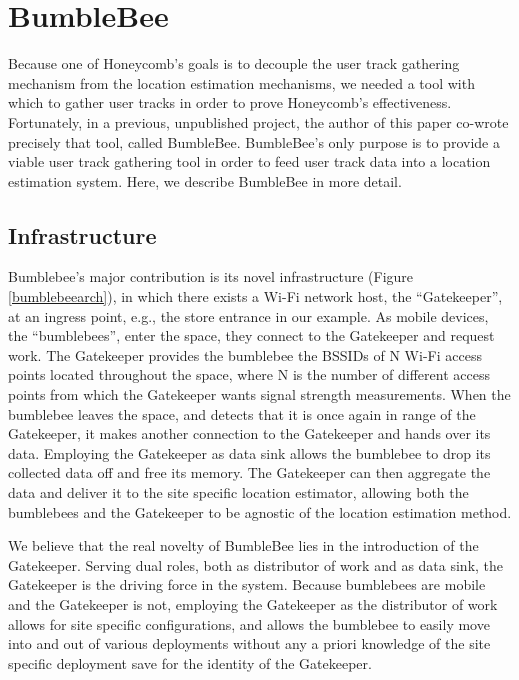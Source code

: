 \chapter{BumbleBee}
\label{bumblebee}
%

Because one of Honeycomb's goals is to decouple the user track gathering mechanism from the location estimation mechanisms, we needed a tool with which to gather user tracks in order to prove Honeycomb's effectiveness. Fortunately, in a previous, unpublished project, the author of this paper co-wrote precisely that tool, called BumbleBee. BumbleBee's only purpose is to provide a viable user track gathering tool in order to feed user track data into a location estimation system. Here, we describe BumbleBee in more detail.


\section{Infrastructure}
%

Bumblebee's major contribution is its novel infrastructure (Figure \ref{bumblebeearch}), in which there exists a Wi-Fi network host, the “Gatekeeper”, at an ingress point, e.g., the store entrance in our example. As mobile devices, the “bumblebees”, enter the space, they connect to the Gatekeeper and request work. The Gatekeeper provides the bumblebee the BSSIDs of N Wi-Fi access points located throughout the space, where N is the number of different access points from which the Gatekeeper wants signal strength measurements. When the bumblebee leaves the space, and detects that it is once again in range of the Gatekeeper, it makes another connection to the Gatekeeper and hands over its data. Employing the Gatekeeper as data sink allows the bumblebee to drop its collected data off and free its memory. The Gatekeeper can then aggregate the data and deliver it to the site specific location estimator, allowing both the bumblebees and the Gatekeeper to be agnostic of the location estimation method.

We believe that the real novelty of BumbleBee lies in the introduction of the Gatekeeper. Serving dual roles, both as distributor of work and as data sink, the Gatekeeper is the driving force in the system. Because bumblebees are mobile and the Gatekeeper is not, employing the Gatekeeper as the distributor of work allows for site specific configurations, and allows the bumblebee to easily move into and out of various deployments without any a priori knowledge of the site specific deployment save for the identity of the Gatekeeper.


